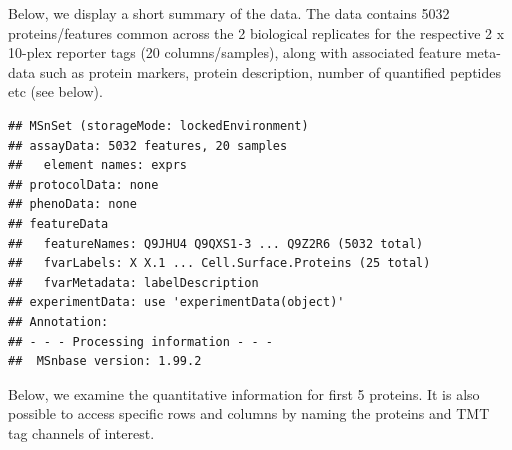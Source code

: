 \begin{Shaded}
\begin{Highlighting}[]
\StringTok{ } \NormalTok{:}\NormalTok{, } \NormalTok{, } \NormalTok{)}
\end{Highlighting}
\end{Shaded}

Below, we display a short summary of the data. The data contains 5032
proteins/features common across the 2 biological replicates for the
respective 2 x 10-plex reporter tags (20 columns/samples), along with
associated feature meta-data such as protein markers, protein
description, number of quantified peptides etc (see below).

\begin{Shaded}
\begin{Highlighting}[]
\end{Highlighting}
\end{Shaded}

\begin{verbatim}
## MSnSet (storageMode: lockedEnvironment)
## assayData: 5032 features, 20 samples 
##   element names: exprs 
## protocolData: none
## phenoData: none
## featureData
##   featureNames: Q9JHU4 Q9QXS1-3 ... Q9Z2R6 (5032 total)
##   fvarLabels: X X.1 ... Cell.Surface.Proteins (25 total)
##   fvarMetadata: labelDescription
## experimentData: use 'experimentData(object)'
## Annotation:  
## - - - Processing information - - -
##  MSnbase version: 1.99.2
\end{verbatim}

Below, we examine the quantitative information for first 5 proteins. It
is also possible to access specific rows and columns by naming the
proteins and TMT tag channels of interest.

\begin{Shaded}
\begin{Highlighting}[]
\NormalTok{(hl)[}\NormalTok{:}\NormalTok{, ]}
\end{Highlighting}
\end{Shaded}

